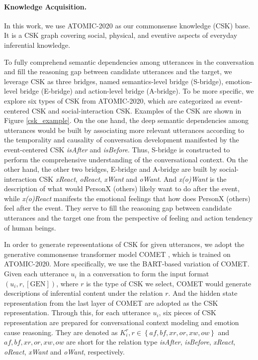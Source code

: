 \documentclass[letterpaper]{article} \usepackage{aaai23}  \usepackage{times}  \usepackage{helvet}  \usepackage{courier}  \usepackage[hyphens]{url}  \usepackage{graphicx} \urlstyle{rm} \def\UrlFont{\rm}  \usepackage{natbib}  \usepackage{caption} \frenchspacing  \setlength{\pdfpagewidth}{8.5in} \setlength{\pdfpageheight}{11in} \usepackage{algorithm}
\begin{document}
\paragraph{Knowledge Acquisition.}
In this work, we use ATOMIC-2020 \cite{csk} as our commonsense knowledge (CSK) base. It is a CSK graph covering social, physical, and eventive aspects of everyday inferential knowledge.

To fully comprehend semantic dependencies among utterances in the conversation and fill the reasoning gap between candidate utterances and the target, we leverage CSK as three bridges, named semantics-level bridge (S-bridge), emotion-level bridge (E-bridge) and action-level bridge (A-bridge). To be more specific, we explore six types of CSK from ATOMIC-2020, which are categorized as event-centered CSK and social-interaction CSK. Examples of the CSK are shown in Figure \ref{csk_example}. On the one hand, the deep semantic dependencies among utterances would be built by associating more relevant utterances according to the temporality and causality of conversation development manifested by the event-centered CSK \emph{isAfter} and \emph{isBefore}. Thus, S-bridge is constructed to perform the comprehensive understanding of the conversational context. On the other hand, the other two bridges, E-bridge and A-bridge are built by social-interaction CSK \emph{xReact}, \emph{oReact}, \emph{xWant} and \emph{oWant}. And \emph{x(o)Want} is the description of what would PersonX (others) likely want to do after the event, while \emph{x(o)React} manifests the emotional feelings that how does PersonX (others) feel after the event. They serve to fill the reasoning gap between candidate utterances and the target one from the perspective of feeling and action tendency of human beings.

In order to generate representations of CSK for given utterances, we adopt the generative commonsense transformer model COMET \cite{comet}, which is trained on ATOMIC-2020. More specifically, we use the BART-based \cite{bart} variation of COMET. Given each utterance $u_i$ in a conversation to form the input format $(u_i, r, [\textrm{GEN}])$, where $r$ is the type of CSK we select, COMET would generate descriptions of inferential content under the relation $r$. And the hidden state representation from the last layer of COMET are adopted as the CSK representation. Through this, for each utterance $u_i$, six pieces of CSK representation are prepared for conversational context modeling and emotion cause reasoning. They are denoted as $K^r_i, r \in \left\{af, bf, xr, or, xw, ow\right\}$ and $af, bf, xr, or, xw, ow$ are short for the relation type \emph{isAfter}, \emph{isBefore}, \emph{xReact}, \emph{oReact}, \emph{xWant} and \emph{oWant}, respectively.
\end{document}
